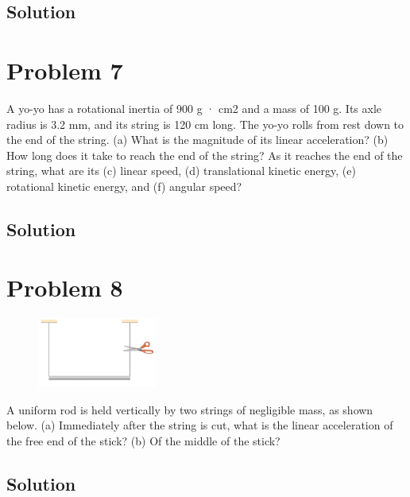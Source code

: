 \documentclass[12pt]{article}
\begin{document}
\subsection{Solution}


\pagebreak
\section{Problem 7}
A yo-yo has a rotational inertia of 900 g · cm2 and a mass of 100 g. Its axle radius is 3.2 mm, and its string is 120 cm long. The yo-yo rolls from rest down to the end of the string. (a) What is the magnitude of its linear acceleration? (b) How long does it take to reach the end of the string? As it reaches the end of the string, what are its (c) linear speed, (d) translational kinetic energy, (e) rotational kinetic energy, and (f) angular speed?

\subsection{Solution}


\pagebreak
\section{Problem 8}
\begin{figure}
    \vspace{-30pt}
    \includegraphics[width=0.35\textwidth]{graph_8.png} 
\end{figure}
A uniform rod is held vertically by two strings of negligible mass, as shown below. (a) Immediately after the string is cut, what is the linear acceleration of the free end of the stick? (b) Of the middle of the stick?

\subsection{Solution}
\end{document}

